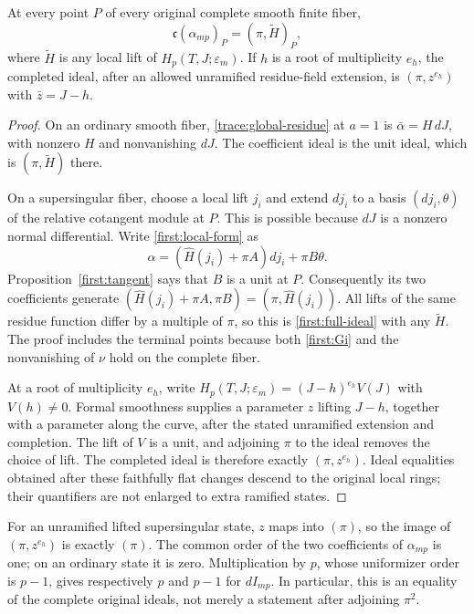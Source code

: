 \begin{theorem}
\label{first:ideal}
At every point $P$ of every original complete smooth finite fiber,
\begin{equation}
 \mathfrak c(\alpha_{mp})_P=(\pi,\widetilde H)_P,
 \label{first:full-ideal}
\end{equation}
where $\widetilde H$ is any local lift of $H_p(T,J;\varepsilon_m)$.
If $h$ is a root of multiplicity $e_h$, the completed ideal, after
an allowed unramified residue-field extension, is $(\pi,z^{e_h})$
with $\bar z=J-h$.
\end{theorem}

\begin{proof}
On an ordinary smooth fiber, \eqref{trace:global-residue} at $a=1$
is $\bar\alpha=H\,dJ$, with nonzero $H$ and nonvanishing $dJ$.
The coefficient ideal is the unit ideal, which is
$(\pi,\widetilde H)$ there.

On a supersingular fiber, choose a local lift $j_i$ and extend $dj_i$
to a basis $(dj_i,\theta)$ of the relative cotangent module at $P$.
This is possible because $dJ$ is a nonzero normal differential.
Write \eqref{first:local-form} as
\[
 \alpha=(\widehat H(j_i)+\pi A)dj_i+\pi B\theta.
\]
Proposition~\ref{first:tangent} says that $B$ is a unit at $P$.
Consequently its two coefficients generate
$(\widehat H(j_i)+\pi A,\pi B)=(\pi,\widehat H(j_i))$.
All lifts of the same residue function differ by a multiple of $\pi$,
so this is \eqref{first:full-ideal} with any $\widetilde H$.
The proof includes the terminal points because both \eqref{first:Gi}
and the nonvanishing of $\nu$ hold on the complete fiber.

At a root of multiplicity $e_h$, write
$H_p(T,J;\varepsilon_m)=(J-h)^{e_h}V(J)$ with $V(h)\ne0$.
Formal smoothness supplies a parameter $z$ lifting $J-h$, together
with a parameter along the curve, after the stated unramified
extension and completion. The lift of $V$ is a unit, and adjoining
$\pi$ to the ideal removes the choice of lift. The completed ideal
is therefore exactly $(\pi,z^{e_h})$. Ideal equalities obtained
after these faithfully flat changes descend to the original local
rings; their quantifiers are not enlarged to extra ramified states.
\end{proof}

For an unramified lifted supersingular state, $z$ maps into $(\pi)$,
so the image of $(\pi,z^{e_h})$ is exactly $(\pi)$. The common order
of the two coefficients of $\alpha_{mp}$ is one; on an ordinary state
it is zero. Multiplication by $p$, whose uniformizer order is $p-1$,
gives respectively $p$ and $p-1$ for $dI_{mp}$. In particular, this
is an equality of the complete original ideals, not merely a statement
after adjoining $\pi^2$.

